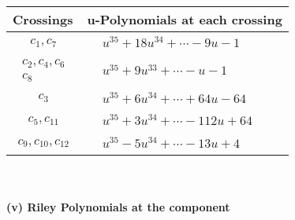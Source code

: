 \documentclass[1p]{elsarticle_modified}
\theoremstyle{definition}
\begin{document}
\begin{tabular}{m{50pt}|m{274pt}}
Crossings & \hspace{64pt}u-Polynomials at each crossing \\
\hline $$\begin{aligned}c_{1},c_{7}\end{aligned}$$&$\begin{aligned}
&u^{35}+18 u^{34}+\cdots-9 u-1
\end{aligned}$\\
\hline $$\begin{aligned}c_{2},c_{4},c_{6}\\c_{8}\end{aligned}$$&$\begin{aligned}
&u^{35}+9 u^{33}+\cdots- u-1
\end{aligned}$\\
\hline $$\begin{aligned}c_{3}\end{aligned}$$&$\begin{aligned}
&u^{35}+6 u^{34}+\cdots+64 u-64
\end{aligned}$\\
\hline $$\begin{aligned}c_{5},c_{11}\end{aligned}$$&$\begin{aligned}
&u^{35}+3 u^{34}+\cdots-112 u+64
\end{aligned}$\\
\hline $$\begin{aligned}c_{9},c_{10},c_{12}\end{aligned}$$&$\begin{aligned}
&u^{35}-5 u^{34}+\cdots-13 u+4
\end{aligned}$\\
\hline
\end{tabular}\\~\\
\newpage\renewcommand{\arraystretch}{1}
\flushleft \textbf{(v) Riley Polynomials at the component}\newline \\
\end{document}
